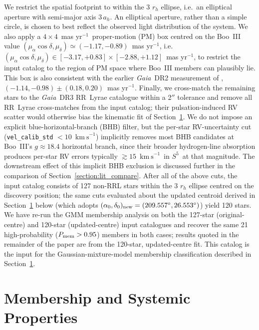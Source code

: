 \documentclass[twocolumn]{aastex631}
\newcommand{\SSSSS}{${S}^5$\xspace}
\newcommand{\gaia}{\textit{Gaia}\xspace}
\newcommand{\vlosUnits}{$\mathrm{km~s}^{-1}$\xspace}
\newcommand{\pmUnits}{mas yr$^{-1}$\xspace}
\begin{document}


We restrict the spatial footprint to within the 3 $r_h$ ellipse, i.e.\ an elliptical aperture with semi-major axis $3\,a_h$. An elliptical aperture, rather than a simple circle, is chosen to best reflect the observed light distribution of the system.
We also apply a $4\times 4$~\pmUnits\ proper-motion (PM) box centred on the \citet{Pace2022} Boo~III value $(\mu_\alpha\cos\delta, \mu_\delta) \simeq (-1.17, -0.89)$~\pmUnits, i.e.\ $(\mu_\alpha\cos\delta, \mu_\delta) \in [-3.17, +0.83] \times [-2.88, +1.12]$~\pmUnits, to restrict the input catalog to the region of PM space where Boo~III members can plausibly lie.  This box is also consistent with the earlier \gaia~DR2 measurement of \citet{Carlin2018}, $(-1.14, -0.98) \pm (0.18, 0.20)$~\pmUnits.
Finally, we cross-match the remaining stars to the \gaia\ DR3 RR~Lyrae catalogue \citep{GaiaRRL_reference} within a 2$''$ tolerance and remove all RR~Lyrae cross-matches from the input catalog; their pulsation-induced RV scatter would otherwise bias the kinematic fit of Section~\ref{section:membership}. We do not impose an explicit blue-horizontal-branch (BHB) filter, but the per-star RV-uncertainty cut (\texttt{vel\_calib\_std} $< 10$~\vlosUnits) implicitly removes most BHB candidates at Boo~III's $g \approx 18.4$ horizontal branch, since their broader hydrogen-line absorption produces per-star RV errors typically $\gtrsim 15$~\vlosUnits\ in \SSSSS\ at that magnitude. The downstream effect of this implicit BHB exclusion is discussed further in the \citet{Geha2026} comparison of Section~\ref{section:lit_compare}.
After all of the above cuts, the input catalog consists of 127 non-RRL stars within the 3 $r_h$ ellipse centred on the \citet{Grillmair2009} discovery position; the same cuts evaluated about the updated centroid derived in Section~\ref{section:membership} below (which adopts $(\alpha_0,\delta_0)_{\rm new} = (209.557^\circ, 26.553^\circ)$) yield 120 stars.  We have re-run the GMM membership analysis on both the 127-star (original-centre) and 120-star (updated-centre) input catalogues and recover the same 21 high-probability ($P_{\rm mem} > 0.95$) members in both cases; results quoted in the remainder of the paper are from the 120-star, updated-centre fit. This catalog is the input for the Gaussian-mixture-model membership classification described in Section~\ref{section:membership}.

\section{Membership and Systemic Properties} \label{section:membership}
\end{document}
